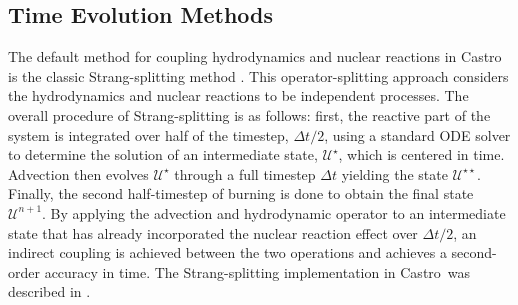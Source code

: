 \documentclass[preprint,times,tighten]{aastex631}
\newcommand{\castro}{{\sf Castro}}
\begin{document}


\subsection{Time Evolution Methods}\label{Sec:integration}

The default method for coupling hydrodynamics and nuclear reactions in {\castro} is the classic Strang-splitting method \citep{strang:1968}. This operator-splitting approach considers the hydrodynamics and nuclear reactions to be independent processes. 
The overall procedure of Strang-splitting is as follows: first, the reactive part of the system is integrated over half of the timestep, $\Delta t/2$, using a standard ODE solver to determine the solution of an intermediate state, $\mathcal{U}^\star$, which is centered in time. Advection then
evolves $\mathcal{U}^\star$ through a full timestep $\Delta t$
yielding the state $\mathcal{U}^{\star\star}$.  Finally,
the second half-timestep of burning is done to obtain the final state $\mathcal{U}^{n+1}$. By applying the advection and hydrodynamic operator to an intermediate state that has already incorporated the nuclear reaction effect over $\Delta t/2$, an indirect coupling is achieved between the two operations and achieves a second-order accuracy in time.  The Strang-splitting implementation
in \castro\ was described in \cite{castro_strang}.

\begin{comment}
If $\mathcal{A}$ represents the operator that updates both advection and hydrodynamic sources and $\mathcal{R}$ represents the operator that updates nuclear reactions, then the overall procedure of updating the state, $\mathcal{U}^n$, with time index, $n$, to a new state in the next time step, $\mathcal{U}^{n+1}$, can be summarized as:
\begin{equation}\label{Eq:strang-update}
    \mathcal{U}^{n+1} = \mathcal{R}_{\Delta t/2} \mathcal{A}_{\Delta t} \mathcal{R}_{\Delta t/2} \mathcal{U}^n
\end{equation}
\end{comment}
\end{document}
